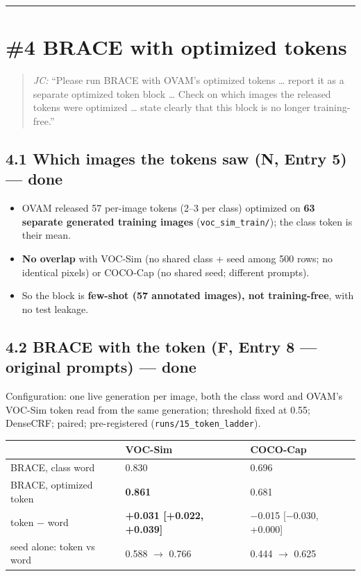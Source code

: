 \documentclass[
  10pt,
]{article}
\newcounter{none} %
\providecommand{\tightlist}{%
  \setlength{\itemsep}{0pt}\setlength{\parskip}{0pt}}
\begin{document}
\begin{center}\rule{0.5\linewidth}{0.5pt}\end{center}

\section{\#4 BRACE with optimized tokens}

\begin{quote}
\emph{JC:} ``Please run BRACE with OVAM's optimized tokens \ldots{}
report it as a separate \guillemotleft{}optimized token\guillemotright{} block \ldots{} Check on which
images the released tokens were optimized \ldots{} state clearly that
this block is no longer training-free.''
\end{quote}

\subsection{4.1 Which images the tokens saw (N, Entry 5) --- done}

\begin{itemize}
\tightlist
\item
  OVAM released 57 per-image tokens (2--3 per class) optimized on
  \textbf{63 separate generated training images}
  (\texttt{voc\_sim\_train/}); the class token is their mean.
\item
  \textbf{No overlap} with VOC-Sim (no shared class + seed among 500
  rows; no identical pixels) or COCO-Cap (no shared seed; different
  prompts).
\item
  So the block is \textbf{few-shot (57 annotated images), not
  training-free}, with no test leakage.
\end{itemize}

\subsection{4.2 BRACE with the token (F, Entry 8 --- original prompts)
--- done}

Configuration: one live generation per image, both the class word and
OVAM's VOC-Sim token read from the same generation; threshold fixed at
0.55; DenseCRF; paired; pre-registered
(\texttt{runs/15\_token\_ladder}).

{\def\LTcaptype{none} %
\begin{longtable}[]{@{}lll@{}}
\toprule\noalign{}
& VOC-Sim & COCO-Cap \\
\midrule\noalign{}
\endhead
\bottomrule\noalign{}
\endlastfoot
BRACE, class word & 0.830 & 0.696 \\
BRACE, optimized token & \textbf{0.861} & 0.681 \\
token \ensuremath{-} word & \textbf{+0.031 {[}+0.022, +0.039{]}} & \ensuremath{-}0.015 {[}\ensuremath{-}0.030,
+0.000{]} \\
seed alone: token vs word & 0.588 \ensuremath{\rightarrow} 0.766 & 0.444 \ensuremath{\rightarrow} 0.625 \\
\end{longtable}
}
\end{document}
